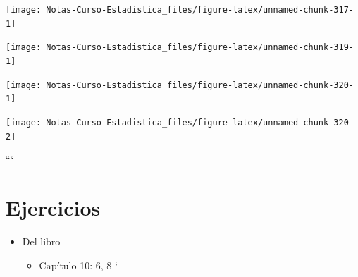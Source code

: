 \documentclass[
  12pt,
]{book}
\newenvironment{Shaded}{\begin{snugshade}}{\end{snugshade}}
\newcommand{\DecValTok}[1]{\textcolor[rgb]{0.00,0.00,0.81}{#1}}
\newcommand{\FunctionTok}[1]{\textcolor[rgb]{0.00,0.00,0.00}{#1}}
\newcommand{\NormalTok}[1]{#1}
\newcommand{\SpecialCharTok}[1]{\textcolor[rgb]{0.00,0.00,0.00}{#1}}
\providecommand{\tightlist}{%
  \setlength{\itemsep}{0pt}\setlength{\parskip}{0pt}}
\theoremstyle{definition}
\theoremstyle{definition}
\theoremstyle{definition}
\theoremstyle{remark}
\begin{document}
\begin{center}\texttt{[image: Notas-Curso-Estadistica\_files/figure-latex/unnamed-chunk-317-1]} \end{center}

\begin{center}\texttt{[image: Notas-Curso-Estadistica\_files/figure-latex/unnamed-chunk-319-1]} \end{center}

\begin{Shaded}
\end{Shaded}

\begin{center}\texttt{[image: Notas-Curso-Estadistica\_files/figure-latex/unnamed-chunk-320-1]} \end{center}

\begin{Shaded}
\end{Shaded}

\begin{center}\texttt{[image: Notas-Curso-Estadistica\_files/figure-latex/unnamed-chunk-320-2]} \end{center}

```

\hypertarget{ejercicios-6}{%
\section{Ejercicios}\label{ejercicios-6}}

\begin{itemize}
\tightlist
\item
  Del libro \autocite{James2013b}

  \begin{itemize}
  \tightlist
  \item
    Capítulo 10: 6, 8
    `
  \end{itemize}
\end{itemize}

\printbibliography
\end{document}
